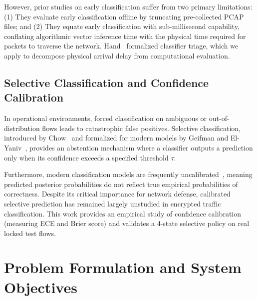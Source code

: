 \documentclass[conference]{IEEEtran}
\begin{document}
However, prior studies on early classification suffer from two primary limitations: (1) They evaluate early classification offline by truncating pre-collected PCAP files; and (2) They equate early classification with sub-millisecond capability, conflating algorithmic vector inference time with the physical time required for packets to traverse the network. Hand~\cite{hand2009measuring} formalized classifier triage, which we apply to decompose physical arrival delay from computational evaluation.

\subsection{Selective Classification and Confidence Calibration}
In operational environments, forced classification on ambiguous or out-of-distribution flows leads to catastrophic false positives. Selective classification, introduced by Chow~\cite{chow1970optimum} and formalized for modern models by Geifman and El-Yaniv~\cite{geifman2017selective,geifman2019selectivenet}, provides an abstention mechanism where a classifier outputs a prediction only when its confidence exceeds a specified threshold $\tau$.

Furthermore, modern classification models are frequently uncalibrated~\cite{guo2017calibration,niculescu2005predicting}, meaning predicted posterior probabilities do not reflect true empirical probabilities of correctness. Despite its critical importance for network defense, calibrated selective prediction has remained largely unstudied in encrypted traffic classification. This work provides an empirical study of confidence calibration (measuring ECE and Brier score) and validates a 4-state selective policy on real locked test flows.

\section{Problem Formulation and System Objectives}
\label{sec:problem}
\end{document}
